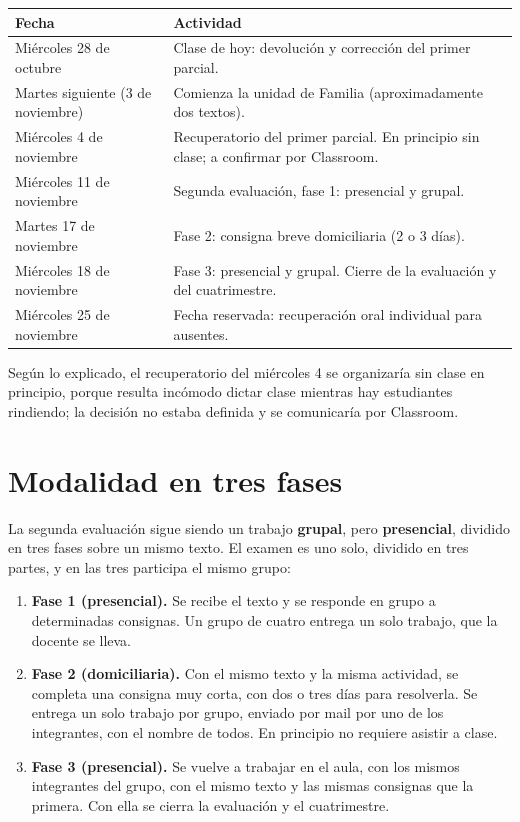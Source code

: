 \documentclass[12pt,oneside]{book}
\begin{document}
\begin{table}[H]
\centering
\renewcommand{\arraystretch}{1.3}
\begin{tabularx}{\textwidth}{
    >{\raggedright\arraybackslash}p{}
    >{\raggedright\arraybackslash}X
}
\toprule
\textbf{Fecha} & \textbf{Actividad} \\
\midrule
Miércoles 28 de octubre & Clase de hoy: devolución y corrección del primer parcial. \\
Martes siguiente (3 de noviembre) & Comienza la unidad de Familia (aproximadamente dos textos). \\
Miércoles 4 de noviembre & Recuperatorio del primer parcial. En principio sin clase; a confirmar por Classroom. \\
Miércoles 11 de noviembre & Segunda evaluación, fase 1: presencial y grupal. \\
Martes 17 de noviembre & Fase 2: consigna breve domiciliaria (2 o 3 días). \\
Miércoles 18 de noviembre & Fase 3: presencial y grupal. Cierre de la evaluación y del cuatrimestre. \\
Miércoles 25 de noviembre & Fecha reservada: recuperación oral individual para ausentes. \\
\bottomrule
\end{tabularx}
\end{table}

Según lo explicado, el recuperatorio del miércoles 4 se organizaría sin clase en principio, porque resulta incómodo dictar clase mientras hay estudiantes rindiendo; la decisión no estaba definida y se comunicaría por Classroom.

\section{Modalidad en tres fases}

La segunda evaluación sigue siendo un trabajo \textbf{grupal}, pero \textbf{presencial}, dividido en tres fases sobre un mismo texto. El examen es uno solo, dividido en tres partes, y en las tres participa el mismo grupo:

\begin{enumerate}
    \item \textbf{Fase 1 (presencial).} Se recibe el texto y se responde en grupo a determinadas consignas. Un grupo de cuatro entrega un solo trabajo, que la docente se lleva.
    \item \textbf{Fase 2 (domiciliaria).} Con el mismo texto y la misma actividad, se completa una consigna muy corta, con dos o tres días para resolverla. Se entrega un solo trabajo por grupo, enviado por mail por uno de los integrantes, con el nombre de todos. En principio no requiere asistir a clase.
    \item \textbf{Fase 3 (presencial).} Se vuelve a trabajar en el aula, con los mismos integrantes del grupo, con el mismo texto y las mismas consignas que la primera. Con ella se cierra la evaluación y el cuatrimestre.
\end{enumerate}
\end{document}
